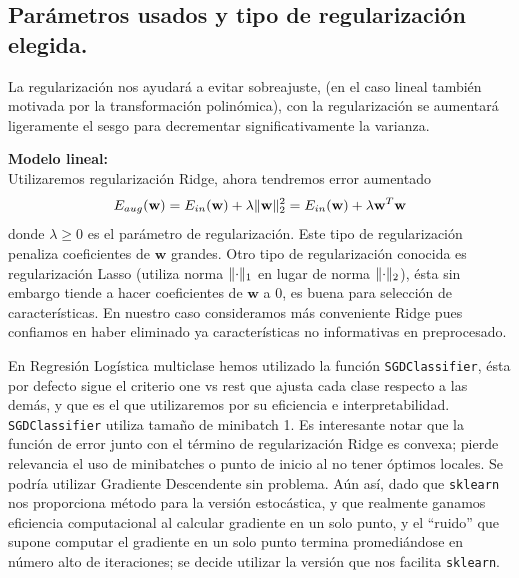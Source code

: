 \documentclass[11pt,a4paper]{article}
\DeclarePairedDelimiter{\norm}{\lVert}{\rVert}
\theoremstyle{definition}
\begin{document}
	\subsection{Parámetros usados y tipo de regularización elegida.}
	La regularización nos ayudará a evitar sobreajuste, (en el caso lineal también motivada por la transformación polinómica), con la regularización se aumentará ligeramente el sesgo para decrementar significativamente la varianza. 

	\textbf{Modelo lineal:}	\\
	Utilizaremos regularización Ridge, ahora tendremos error aumentado 
	$$E_{aug}(\mathbf{w})=E_{in}(\mathbf{w})+\lambda \norm{\mathbf{w}}_2^2 = E_{in}(\mathbf{w})+\lambda \mathbf{w}^T\mathbf{w}$$
	donde $\lambda \geq 0$ es el parámetro de regularización. Este tipo de regularización penaliza coeficientes de $\mathbf{w}$ grandes. Otro tipo de regularización conocida es regularización Lasso (utiliza norma $\norm{\cdot}_1$ en lugar de norma $\norm{\cdot}_2$), ésta sin embargo tiende a hacer coeficientes de $\mathbf{w}$ a 0, es buena para selección de características. En nuestro caso consideramos más conveniente Ridge pues confiamos en haber eliminado ya características no informativas en preprocesado.
	
	
	En Regresión Logística multiclase hemos utilizado la función \texttt{SGDClassifier}, ésta por defecto sigue el criterio one vs rest que ajusta cada clase respecto a las demás, y que es el que utilizaremos por su eficiencia e interpretabilidad. \texttt{SGDClassifier} utiliza tamaño de minibatch 1. Es interesante notar que la función de error junto con el término de regularización Ridge es convexa; pierde relevancia el uso de minibatches o punto de inicio al no tener óptimos locales. Se podría utilizar Gradiente Descendente sin problema. Aún así, dado que \texttt{sklearn} nos proporciona método para la versión estocástica, y que realmente ganamos eficiencia computacional al calcular gradiente en un solo punto, y el ``ruido'' que supone computar el gradiente en un solo punto termina promediándose en número alto de iteraciones; se decide utilizar la versión que nos facilita \texttt{sklearn}.
	
\end{document}
